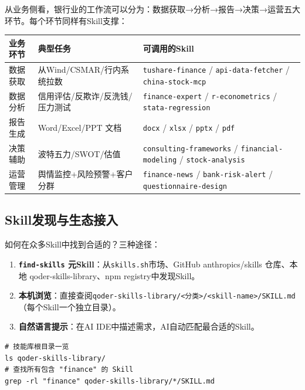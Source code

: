 从业务侧看，银行业的工作流可以分为：数据获取→分析→报告→决策→运营五大环节。每个环节同样有Skill支撑：

\begin{table}[H]
\centering
\begin{tabular}{lp{6cm}p{6cm}}
\toprule
\textbf{业务环节} & \textbf{典型任务} & \textbf{可调用的Skill} \\
\midrule
数据获取 & 从Wind/CSMAR/行内系统拉数 & \texttt{tushare-finance} / \texttt{api-data-fetcher} / \texttt{china-stock-mcp} \\
数据分析 & 信用评估/反欺诈/反洗钱/压力测试 & \texttt{finance-expert} / \texttt{r-econometrics} / \texttt{stata-regression} \\
报告生成 & Word/Excel/PPT 文档 & \texttt{docx} / \texttt{xlsx} / \texttt{pptx} / \texttt{pdf} \\
决策辅助 & 波特五力/SWOT/估值 & \texttt{consulting-frameworks} / \texttt{financial-modeling} / \texttt{stock-analysis} \\
运营管理 & 舆情监控+风险预警+客户分群 & \texttt{finance-news} / \texttt{bank-risk-alert} / \texttt{questionnaire-design} \\
\bottomrule
\end{tabular}
\end{table}

\subsection{Skill发现与生态接入}

如何在众多Skill中找到合适的？三种途径：

\begin{enumerate}[leftmargin=2em]
  \item \textbf{\texttt{find-skills} 元Skill}：从\texttt{skills.sh}市场、GitHub anthropics/skills 仓库、本地 qoder-skills-library、npm registry中发现Skill。
  \item \textbf{本机浏览}：直接查阅\texttt{qoder-skills-library/<分类>/<skill-name>/SKILL.md}（每个Skill一个独立目录）。
  \item \textbf{自然语言提示}：在AI IDE中描述需求，AI自动匹配最合适的Skill。
\end{enumerate}

\begin{lstlisting}[style=shell]
# 技能库根目录一览
ls qoder-skills-library/
# 查找所有包含 "finance" 的 Skill
grep -rl "finance" qoder-skills-library/*/SKILL.md
\end{lstlisting}


